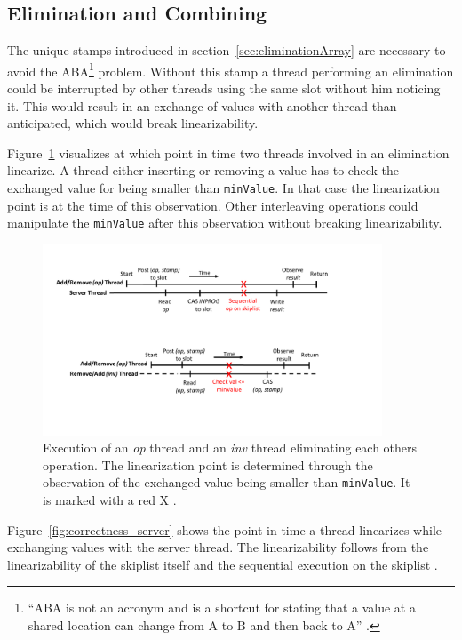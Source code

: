 \subsection{Elimination and Combining}

The unique stamps introduced in section~\ref{sec:eliminationArray} are necessary to avoid the ABA\footnote{\enquote{ABA is not an acronym and is a shortcut for stating that a value at a shared location can change from A to B and then back to A} \cite[185]{dechev_understanding_2010}.} problem. Without this stamp a thread performing an elimination could be interrupted by other threads using the same slot without him noticing it. This would result in an exchange of values with another thread than anticipated, which would break linearizability.

Figure~\ref{fig:correctness_elim} visualizes at which point in time two threads involved in an elimination linearize. A thread either inserting or removing a value has to check the exchanged value for being smaller than \texttt{minValue}. In that case the linearization point is at the time of this observation. Other interleaving operations could manipulate the \texttt{minValue} after this observation without breaking linearizability.

\begin{figure}
	\centering
	\includegraphics[width=0.9\textwidth]{graphics/correctness2.pdf}
	\caption{Execution of an \emph{op} thread and an \emph{inv} thread eliminating each others operation. The linearization point is determined through the observation of the exchanged value being smaller than \texttt{minValue}. It is marked with a red X \cite{calciu_adaptive_2014}.}
	\label{fig:correctness_elim}
\end{figure}

Figure~\ref{fig:correctness_server} shows the point in time a thread linearizes while exchanging values with the server thread. The linearizability follows from the linearizability of the skiplist itself and the sequential execution on the skiplist \cite{calciu_adaptive_2014}. 

